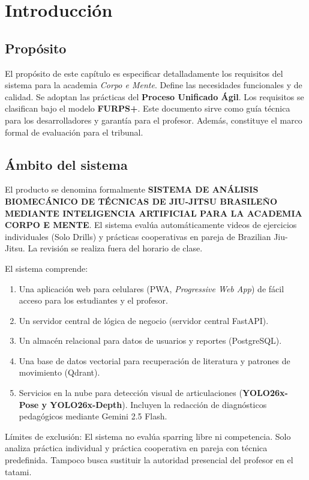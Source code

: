 \documentclass[12pt,letterpaper]{article}
\begin{document}
\section{Introducción}

\subsection{Propósito}
El propósito de este capítulo es especificar detalladamente los requisitos del sistema para la academia \textit{Corpo e Mente}. Define las necesidades funcionales y de calidad. Se adoptan las prácticas del \textbf{Proceso Unificado Ágil}. Los requisitos se clasifican bajo el modelo \textbf{FURPS+}. Este documento sirve como guía técnica para los desarrolladores y garantía para el profesor. Además, constituye el marco formal de evaluación para el tribunal.

\subsection{Ámbito del sistema}
El producto se denomina formalmente \textbf{SISTEMA DE ANÁLISIS BIOMECÁNICO DE TÉCNICAS DE JIU-JITSU BRASILEÑO MEDIANTE INTELIGENCIA ARTIFICIAL PARA LA ACADEMIA CORPO E MENTE}. El sistema evalúa automáticamente videos de ejercicios individuales (Solo Drills) y prácticas cooperativas en pareja de Brazilian Jiu-Jitsu. La revisión se realiza fuera del horario de clase.

El sistema comprende:
\begin{enumerate}
    \item Una aplicación web para celulares (PWA, \textit{Progressive Web App}) de fácil acceso para los estudiantes y el profesor.
    \item Un servidor central de lógica de negocio (servidor central FastAPI).
    \item Un almacén relacional para datos de usuarios y reportes (PostgreSQL).
    \item Una base de datos vectorial para recuperación de literatura y patrones de movimiento (Qdrant).
    \item Servicios en la nube para detección visual de articulaciones (\textbf{YOLO26x-Pose y YOLO26x-Depth}). Incluyen la redacción de diagnósticos pedagógicos mediante Gemini 2.5 Flash.
\end{enumerate}

Límites de exclusión: El sistema no evalúa sparring libre ni competencia. Solo analiza práctica individual y práctica cooperativa en pareja con técnica predefinida. Tampoco busca sustituir la autoridad presencial del profesor en el tatami.
\end{document}
